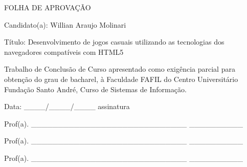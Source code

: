 \thispagestyle{empty}

\vspace{3cm}
\begin{center}
FOLHA DE APROVAÇÃO \\
\end{center}

\vspace{3cm}

\hspace{-2cm} Candidato(a): Willian Araujo Molinari

\vspace{0.5cm}

\hspace{-2cm} Título: Desenvolvimento de jogos casuais utilizando as tecnologias dos navegadores compatíveis com HTML5

\vspace{3cm}

Trabalho de Conclusão de Curso apresentado como exigência parcial para obtenção
do grau de bacharel, à Faculdade FAFIL do Centro Universitário Fundação Santo André,
Curso de Sistemas de Informação.\\

\vspace{3cm}

\hspace{-2cm} Data: \_\_\_\_/\_\_\_\_/\_\_\_\_  \hspace{7cm} assinatura

\vspace{1cm}

\hspace{-2cm} Prof(a). \_\_\_\_\_\_\_\_\_\_\_\_\_\_\_\_\_\_\_\_\_\_\_\_\_\_\_\_\_  \hspace{1cm}\_\_\_\_\_\_\_\_\_\_
\vspace{0.5cm}

\hspace{-2cm} Prof(a). \_\_\_\_\_\_\_\_\_\_\_\_\_\_\_\_\_\_\_\_\_\_\_\_\_\_\_\_\_  \hspace{1cm}\_\_\_\_\_\_\_\_\_\_
\vspace{0.5cm}

\hspace{-2cm} Prof(a). \_\_\_\_\_\_\_\_\_\_\_\_\_\_\_\_\_\_\_\_\_\_\_\_\_\_\_\_\_  \hspace{1cm}\_\_\_\_\_\_\_\_\_\_
